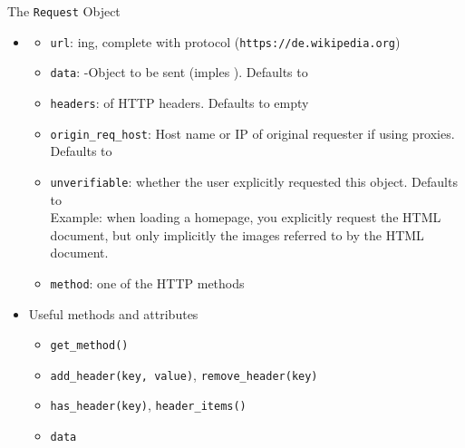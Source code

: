 \begin{frame}{The \texttt{Request} Object}
%
\begin{itemize}
\item {}
	\begin{itemize}
	\item \texttt{url}: ing, complete with protocol (\texttt{{\color{purple}https://}{\color{gray}de.wikipedia.org}})
	\item \texttt{data}: -Object to be sent (imples ). Defaults to 
	\item \texttt{headers}:  of HTTP headers. Defaults to empty 
	\item \texttt{origin\_req\_host}: Host name or IP of original requester if using proxies. \\
		Defaults to 
	\item \texttt{unverifiable}: whether the user explicitly requested this object. Defaults to \\
		Example: when loading a homepage, you explicitly request the HTML document, but only implicitly the images referred to by the HTML document.
	\item \texttt{method}: one of the HTTP methods
	\end{itemize}
\pause
\item Useful methods and attributes
	\begin{itemize}
	\item \texttt{get\_method()}
	\item \texttt{add\_header(key, value)}, \texttt{remove\_header(key)}
	\item \texttt{has\_header(key)}, \texttt{header\_items()}
	\item \texttt{data}
	\end{itemize}
\end{itemize}
%
\end{frame}



